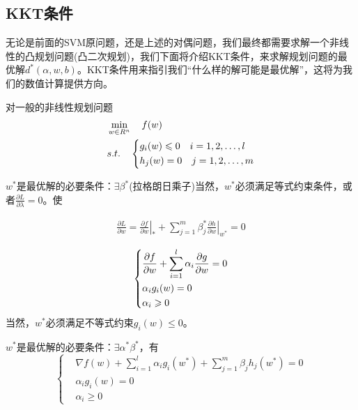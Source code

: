 	\subsection{KKT条件}
		\par
		无论是前面的SVM原问题，还是上述的对偶问题，我们最终都需要求解一个非线性的凸规划问题(凸二次规划)，我们下面将介绍KKT条件，来求解规划问题的最优解$d^*(\alpha,w,b)$。KKT条件用来指引我们“什么样的解可能是最优解”，这将为我们的数值计算提供方向。
		\par
		对一般的非线性规划问题
		\begin{align}
		& \min_{w\in R^n}\quad f(w)\\
		& s.t.\quad
		\left\{
		\begin{aligned}
		& g_i(w) \leqslant 0\quad i=1,2,\dots ,l \notag\\
		& h_j(w) = 0\quad j=1,2,\dots ,m \notag
		\end{aligned}
		\right.
		\end{align}
		\begin{lemma}[等式约束问题的最优解的一阶必要条件]
		$w^*$是最优解的必要条件：$\exists\beta^*$(拉格朗日乘子)当然，$w^*$必须满足等式约束条件，或者$\frac{\partial L}{\partial \lambda}=0$。使
		\end{lemma}
		\begin{align}
		\frac{\partial L}{\partial w} = \left. \frac{\partial f}{\partial w} \right|_*    + \sum_{j=1}^{m} \beta_j^* \left. \frac{\partial h}{\partial w} \right|_{w^*} = 0
		\end{align}
		\begin{lemma}
		\begin{equation*}
		\centering
		\left\{\begin{lgathered}
		\frac{\partial f}{\partial w} + \sum_{i=1}^{l} \alpha_i \frac{\partial g}{\partial w} = 0 \\
		\alpha_i g_i (w) = 0 \\
		\alpha_i \geqslant 0
		\end{lgathered} \right.
		\end{equation*}
		当然，$w^*$必须满足不等式约束$g_i(w) \leqslant 0$。
		\end{lemma}
		\begin{lemma}[含等式和不等式约束的最优解的一阶必要条件]
		$w^*$是最优解的必要条件：$\exists\alpha^*\beta^*$，有
		\[
		\left\{
		\begin{aligned}
		& \nabla f(w) + \sum_{i=1}^{l} \alpha_i g_i(w^*) + \sum_{j=1}^{m} \beta_j h_j (w^*) = 0 \\
		& \alpha_i g_i(w) = 0 \\
		& \alpha_i \geqslant 0
		\end{aligned}
		\right.
		\]
		\end{lemma}
